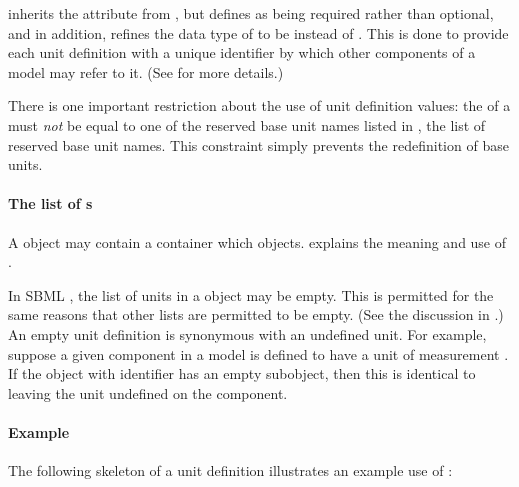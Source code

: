 \begin{blockChanged}


\UnitDefinition inherits the  attribute from \SBase, but defines  as being required rather than optional, and in addition, refines the data type of  to be  instead of .  This is done to provide each unit definition with a unique identifier by which other components of a model may refer to it.  (See  for more details.)

\end{blockChanged}

There is one important restriction about the use of unit
definition  values: the  of a \UnitDefinition
must \emph{not} be equal to one of the reserved base unit
  names listed in , the list of reserved
base unit names.  This constraint simply prevents the redefinition
of base units.


\paragraph{The list of s}
\label{sec:listofunits}

A \UnitDefinition object may contain a \ListOfUnits container which  \Unit objects.  explains
the meaning and use of \Unit.   

\begin{blockChanged}

In SBML \thisLV, the list of units in a \UnitDefinition object may be empty.  This is permitted for the same reasons that other lists are permitted to be empty.  (See the discussion in .)  An empty unit definition is synonymous with an undefined unit.  For example, suppose a given component in a model is defined to have a unit of measurement .  If the \UnitDefinition object with identifier  has an empty \ListOfUnits subobject, then this is identical to leaving the unit undefined on the component.

\end{blockChanged}


\paragraph{Example}

The following skeleton of a unit definition illustrates an example
use of \UnitDefinition:

